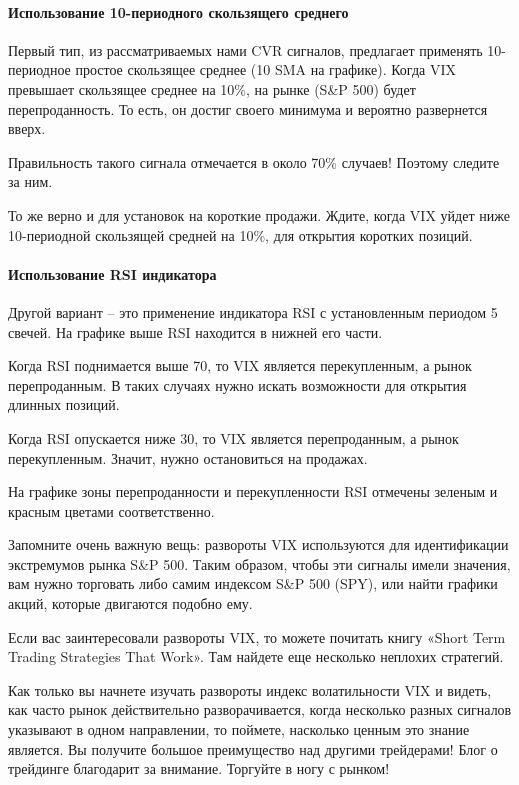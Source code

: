 \documentclass[a5paper]{article}
\begin{document}
\paragraph{Использование 10-периодного скользящего среднего}

Первый тип, из рассматриваемых нами CVR сигналов, предлагает применять 10-периодное простое скользящее среднее (10 SMA на графике). Когда VIX превышает скользящее среднее на 10\%, на рынке (S\&P 500) будет перепроданность. То есть, он достиг своего минимума и вероятно развернется вверх.

Правильность такого сигнала отмечается в около 70\% случаев! Поэтому следите за ним.

То же верно и для установок на короткие продажи. Ждите, когда VIX
уйдет ниже 10-периодной скользящей средней на 10\%, для открытия коротких позиций.

\paragraph{Использование RSI индикатора}

Другой вариант – это применение индикатора RSI с установленным периодом 5 свечей. На графике выше RSI находится в нижней его части.

Когда RSI поднимается выше 70, то VIX является перекупленным, а рынок перепроданным. В таких случаях нужно искать возможности для открытия длинных позиций.

Когда RSI опускается ниже 30, то VIX является перепроданным, а рынок перекупленным. Значит, нужно остановиться на продажах.

На графике зоны перепроданности и перекупленности RSI отмечены зеленым и красным цветами соответственно.

Запомните очень важную вещь: развороты VIX используются для идентификации экстремумов рынка S\&P 500. Таким образом, чтобы эти сигналы имели значения, вам нужно торговать либо самим индексом S\&P 500 (SPY), или найти графики акций, которые двигаются подобно ему.

Если вас заинтересовали развороты VIX, то можете почитать книгу «Short Term Trading Strategies That Work». Там найдете еще несколько неплохих стратегий.

Как только вы начнете изучать развороты индекс волатильности VIX и видеть, как часто рынок действительно разворачивается, когда несколько разных сигналов указывают в одном направлении, то поймете, насколько ценным это знание является. Вы получите большое преимущество над другими трейдерами! Блог о трейдинге благодарит за внимание. Торгуйте в ногу с рынком!
\end{document}

